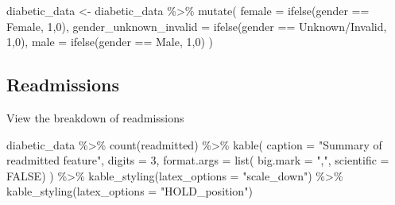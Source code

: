\documentclass[
]{article}
\newenvironment{Shaded}{\begin{snugshade}}{\end{snugshade}}
\newcommand{\AttributeTok}[1]{\textcolor[rgb]{0.77,0.63,0.00}{#1}}
\newcommand{\ConstantTok}[1]{\textcolor[rgb]{0.00,0.00,0.00}{#1}}
\newcommand{\DecValTok}[1]{\textcolor[rgb]{0.00,0.00,0.81}{#1}}
\newcommand{\FunctionTok}[1]{\textcolor[rgb]{0.00,0.00,0.00}{#1}}
\newcommand{\NormalTok}[1]{#1}
\newcommand{\OtherTok}[1]{\textcolor[rgb]{0.56,0.35,0.01}{#1}}
\newcommand{\SpecialCharTok}[1]{\textcolor[rgb]{0.00,0.00,0.00}{#1}}
\newcommand{\StringTok}[1]{\textcolor[rgb]{0.31,0.60,0.02}{#1}}
\begin{document}
\begin{Shaded}
\begin{Highlighting}[]
\NormalTok{diabetic\_data }\OtherTok{\textless{}{-}}\NormalTok{ diabetic\_data }\SpecialCharTok{\%\textgreater{}\%}
  \FunctionTok{mutate}\NormalTok{(}
    \AttributeTok{female =} \FunctionTok{ifelse}\NormalTok{(gender }\SpecialCharTok{==} \StringTok{\textquotesingle{}Female\textquotesingle{}}\NormalTok{, }\DecValTok{1}\NormalTok{,}\DecValTok{0}\NormalTok{),}
    \AttributeTok{gender\_unknown\_invalid =} \FunctionTok{ifelse}\NormalTok{(gender }\SpecialCharTok{==} \StringTok{\textquotesingle{}Unknown/Invalid\textquotesingle{}}\NormalTok{, }\DecValTok{1}\NormalTok{,}\DecValTok{0}\NormalTok{),}
    \AttributeTok{male =} \FunctionTok{ifelse}\NormalTok{(gender }\SpecialCharTok{==} \StringTok{\textquotesingle{}Male\textquotesingle{}}\NormalTok{, }\DecValTok{1}\NormalTok{,}\DecValTok{0}\NormalTok{)}
\NormalTok{  )}
\end{Highlighting}
\end{Shaded}

\hypertarget{readmissions}{%
\subsection{Readmissions}\label{readmissions}}

View the breakdown of readmissions

\begin{Shaded}
\begin{Highlighting}[]
\NormalTok{diabetic\_data }\SpecialCharTok{\%\textgreater{}\%} 
  \FunctionTok{count}\NormalTok{(readmitted) }\SpecialCharTok{\%\textgreater{}\%}
\FunctionTok{kable}\NormalTok{(}
  \AttributeTok{caption =} \StringTok{"Summary of readmitted feature"}\NormalTok{,}
  \AttributeTok{digits =} \DecValTok{3}\NormalTok{,}
  \AttributeTok{format.args =} \FunctionTok{list}\NormalTok{(}
    \AttributeTok{big.mark =} \StringTok{","}\NormalTok{,}
    \AttributeTok{scientific =} \ConstantTok{FALSE}\NormalTok{)}
\NormalTok{  ) }\SpecialCharTok{\%\textgreater{}\%}
  \FunctionTok{kable\_styling}\NormalTok{(}\AttributeTok{latex\_options =} \StringTok{"scale\_down"}\NormalTok{) }\SpecialCharTok{\%\textgreater{}\%}
  \FunctionTok{kable\_styling}\NormalTok{(}\AttributeTok{latex\_options =} \StringTok{"HOLD\_position"}\NormalTok{)}
\end{Highlighting}
\end{Shaded}

\begin{table}[H]

\caption{\label{tab:unnamed-chunk-16}Summary of readmitted feature}
\centering
{}
\end{table}
\end{document}
